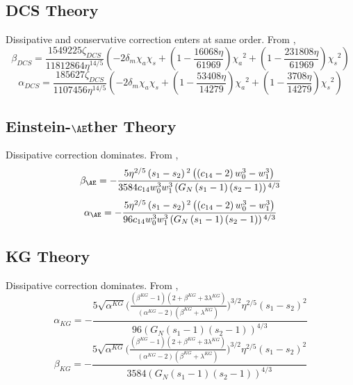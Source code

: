 \documentclass[11pt]{article}
\begin{document}
 \subsection{DCS Theory}
 Dissipative and conservative correction enters at same order.
From \cite{Yagi:2012vf},
 \begin{equation}
 \beta_{DCS}=\frac{1549225 \zeta_{DCS} }{11812864 \eta ^{14/5}}(-2 \text{$\delta_m$} \text{$\chi_a$} \text{$\chi_s$}+\left(1-\frac{16068 \eta }{61969}\right) \text{$\chi_a$}^2+\left(1-\frac{231808 \eta }{61969}\right) \text{$\chi_s$}^2)
 \end{equation}
 \begin{equation}
 \alpha_{DCS}=\frac{185627 \zeta_{DCS} }{1107456 \eta ^{14/5}}(-2 \text{$\delta_m$} \text{$\chi_a$} \text{$\chi_s$}+\left(1-\frac{53408 \eta }{14279}\right) \text{$\chi_a$}^2+\left(1-\frac{3708 \eta }{14279}\right) \text{$\chi_s$}^2)
 \end{equation}
 \subsection{Einstein-$\AE$ther Theory}
 Dissipative correction dominates. From \cite{Hansen:2014ewa},
 \begin{equation}
 \beta_{\AE}=-\frac{5 \eta ^{2/5} \left(s_1-s_2\right){}^2 \left(\left(c_{14}-2\right) w_0^3-w_1^3\right)}{3584 c_{14} w_0^3 w_1^3 \left(\text{$G_N$} \left(s_1-1\right) \left(s_2-1\right)\right){}^{4/3}}
 \end{equation}
 \begin{equation}
 \alpha_{\AE}=-\frac{5 \eta ^{2/5} \left(s_1-s_2\right){}^2 \left(\left(c_{14}-2\right) w_0^3-w_1^3\right)}{96 c_{14} w_0^3 w_1^3 \left(\text{$G_N$} \left(s_1-1\right) \left(s_2-1\right)\right){}^{4/3}}
 \end{equation}
 
 \subsection{KG Theory}
 Dissipative correction dominates. From \cite{Hansen:2014ewa},
 \begin{equation}
 \alpha_{KG}=-\frac{5 \sqrt{\alpha^{KG}}\bigg(\frac{(\beta^{KG}-1)(2+\beta^{KG}+3\lambda^{KG})}{(\alpha^{KG}-2)(\beta^{KG}+\lambda^{KG})}\bigg)^{3/2}\eta ^{2/5} (\text{$s_1$}-\text{$s_2$})^2}{96 (\text{$G_N$} (\text{$s_1$}-1) (\text{$s_2$}-1))^{4/3}}
 \end{equation}
 \begin{equation}
 \beta_{KG}=-\frac{5 \sqrt{\alpha^{KG}}\bigg(\frac{(\beta^{KG}-1)(2+\beta^{KG}+3\lambda^{KG})}{(\alpha^{KG}-2)(\beta^{KG}+\lambda^{KG})}\bigg)^{3/2}\eta ^{2/5} (\text{$s_1$}-\text{$s_2$})^2}{3584(\text{$G_N$} (\text{$s_1$}-1) (\text{$s_2$}-1))^{4/3}}
 \end{equation}
\end{document}
